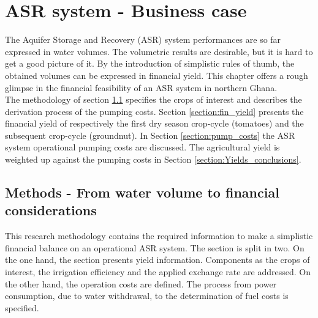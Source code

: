 \chapter{ASR system - Business case}
\label{chapter:yield}
The Aquifer Storage and Recovery (ASR) system performances are so far expressed in water volumes. The volumetric results are desirable, but it is hard to get a good picture of it. By the introduction of simplistic rules of thumb, the obtained volumes can be expressed in financial yield. This chapter offers a rough glimpse in the financial feasibility of an ASR system in northern Ghana. \\
The methodology of section \ref{section:Theory_yields} specifies the crops of interest and describes the derivation process of the pumping costs. Section \ref{section:fin_yield} presents the financial yield of respectively the first dry season crop-cycle (tomatoes) and the subsequent crop-cycle (groundnut). In Section \ref{section:pump_costs} the ASR system operational pumping costs are discussed. The agricultural yield is weighted up against the pumping costs in Section \ref{section:Yields_conclusions}. 


\section{Methods - From water volume to financial considerations}
\label{section:Theory_yields}
This research methodology contains the required information to make a simplistic financial balance on an operational ASR system. The section is split in two. On the one hand, the section presents yield  information. Components as the crops of interest, the irrigation efficiency and the applied exchange rate are addressed. On the other hand, the operation costs are defined. The process from power consumption, due to water withdrawal, to the determination of fuel costs is specified.

